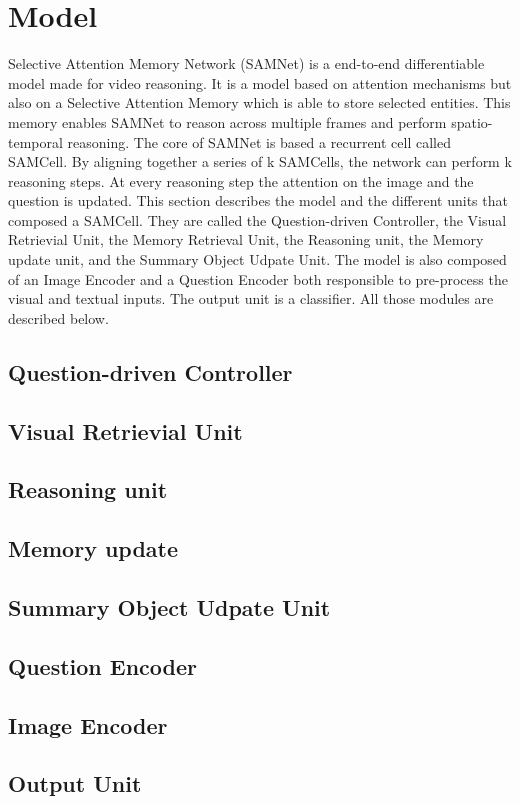 \section{Model}


Selective Attention Memory Network (SAMNet) is a end-to-end differentiable model made for video reasoning. It is a model based on attention mechanisms but also on a Selective Attention Memory which is able to store selected entities. This memory enables SAMNet to reason across multiple frames and perform spatio-temporal reasoning. 
The core of SAMNet is based a recurrent cell called SAMCell. By aligning together a series of k SAMCells, the network can perform k reasoning steps. At every reasoning step the attention on the image and the question is updated. This section describes the model and the different units that composed a SAMCell. They are called the Question-driven Controller, the Visual Retrievial Unit, the Memory Retrieval Unit, the Reasoning unit, the Memory update unit, and the Summary Object Udpate Unit. 
The model is also composed of an Image Encoder and a Question Encoder both responsible to pre-process the visual and textual inputs. The output unit is a classifier.
All those modules are described below.

\subsection{Question-driven Controller}
\subsection{Visual Retrievial Unit}
\subsection{Reasoning unit}
\subsection{Memory update}
\subsection{Summary Object Udpate Unit}
\subsection{Question Encoder}
\subsection{Image Encoder}
\subsection{Output Unit}

